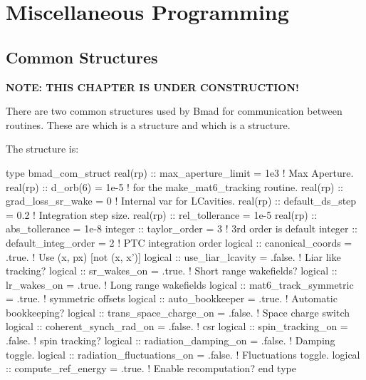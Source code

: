 \chapter{Miscellaneous Programming}

\section{Common Structures}
\label{s:common_struct}


{\bf NOTE: THIS CHAPTER IS UNDER CONSTRUCTION!}

There are two common structures used by Bmad for communication between
routines. These are  which is a 
structure and  which is a 
structure.

The  structure is:
\begin{example}
  type bmad_com_struct
    real(rp) :: max_aperture_limit = 1e3       ! Max Aperture.
    real(rp) :: d_orb(6)           = 1e-5      ! for the make_mat6_tracking routine.
    real(rp) :: grad_loss_sr_wake  = 0         ! Internal var for LCavities.
    real(rp) :: default_ds_step    = 0.2       ! Integration step size.  
    real(rp) :: rel_tollerance = 1e-5
    real(rp) :: abs_tollerance = 1e-8
    integer :: taylor_order = 3                ! 3rd order is default
    integer :: default_integ_order = 2         ! PTC integration order
    logical :: canonical_coords = .true.       ! Use (x, px) [not (x, x')]
    logical :: use_liar_lcavity = .false.      ! Liar like tracking?
    logical :: sr_wakes_on = .true.            ! Short range wakefields?
    logical :: lr_wakes_on = .true.            ! Long range wakefields
    logical :: mat6_track_symmetric = .true.   ! symmetric offsets
    logical :: auto_bookkeeper = .true.        ! Automatic bookkeeping?
    logical :: trans_space_charge_on = .false. ! Space charge switch
    logical :: coherent_synch_rad_on = .false. ! csr 
    logical :: spin_tracking_on = .false.      ! spin tracking?
    logical :: radiation_damping_on = .false.       ! Damping toggle.
    logical :: radiation_fluctuations_on = .false.  ! Fluctuations toggle.
    logical :: compute_ref_energy = .true.          ! Enable recomputation?
  end type
\end{example}


